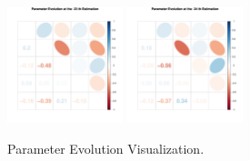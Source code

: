 \begin{figure}[h]
\includegraphics[width=0.3\textwidth,height=0.2\textheight]{Chapters/05MCMCOU/plots/paraEvolution/corMatrix23.pdf}
\includegraphics[width=0.3\textwidth,height=0.2\textheight]{Chapters/05MCMCOU/plots/paraEvolution/corMatrix24.pdf}
\caption{Parameter Evolution Visualization. }
\end{figure}

